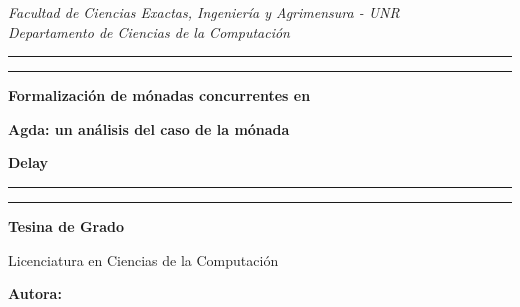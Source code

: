 \hypersetup{pageanchor=false}
\begin{titlepage}  %

	\centering %
	\scshape %
	
	\textit{\large Facultad de Ciencias Exactas, Ingeniería y Agrimensura - UNR\\Departamento de Ciencias de la Computación }
	
	\vspace{2\baselineskip}
	
	
	\rule{\textwidth}{1.6pt}\vspace*{-\baselineskip}\vspace*{2pt} %
	\rule{\textwidth}{0.4pt} %
	
	\vspace{\baselineskip} %
	
	{\LARGE \textbf{Formalización de mónadas concurrentes en}}
	
	{\LARGE \textbf{Agda: un análisis del caso de la mónada}}

	{\LARGE \textbf{Delay}} %
	
	\vspace{0.5\baselineskip} %
	
	\rule{\textwidth}{0.4pt}\vspace*{-\baselineskip}\vspace{3.2pt} %
	\rule{\textwidth}{1.6pt} %
	
	\vspace{3\baselineskip} %
	
	
	{\LARGE \textbf{Tesina de Grado}}

	{\Large Licenciatura en Ciencias de la Computación}
	\vspace*{3\baselineskip} %

	
	
	\Large{\textbf{Autora:}}
	
	

\end{titlepage}
